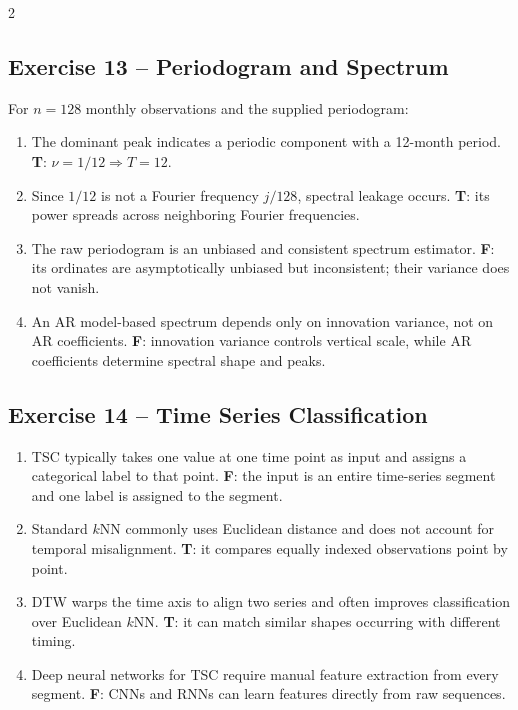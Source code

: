 \documentclass[9pt,a4paper]{extarticle}
\begin{document}
\begin{multicols}{2}
\subsection*{Exercise 13 -- Periodogram and Spectrum}
For \(n=128\) monthly observations and the supplied periodogram:
\begin{enumerate}[label=\alph*),leftmargin=4mm]
\item The dominant peak indicates a periodic component with a 12-month period. \textbf{T}: \(\nu=1/12\Rightarrow T=12\).
\item Since \(1/12\) is not a Fourier frequency \(j/128\), spectral leakage occurs. \textbf{T}: its power spreads across neighboring Fourier frequencies.
\item The raw periodogram is an unbiased and consistent spectrum estimator. \textbf{F}: its ordinates are asymptotically unbiased but inconsistent; their variance does not vanish.
\item An AR model-based spectrum depends only on innovation variance, not on AR coefficients. \textbf{F}: innovation variance controls vertical scale, while AR coefficients determine spectral shape and peaks.
\end{enumerate}

\subsection*{Exercise 14 -- Time Series Classification}
\begin{enumerate}[label=\alph*),leftmargin=4mm]
\item TSC typically takes one value at one time point as input and assigns a categorical label to that point. \textbf{F}: the input is an entire time-series segment and one label is assigned to the segment.
\item Standard \(k\)NN commonly uses Euclidean distance and does not account for temporal misalignment. \textbf{T}: it compares equally indexed observations point by point.
\item DTW warps the time axis to align two series and often improves classification over Euclidean \(k\)NN. \textbf{T}: it can match similar shapes occurring with different timing.
\item Deep neural networks for TSC require manual feature extraction from every segment. \textbf{F}: CNNs and RNNs can learn features directly from raw sequences.
\end{enumerate}


\end{multicols}
\end{document}
